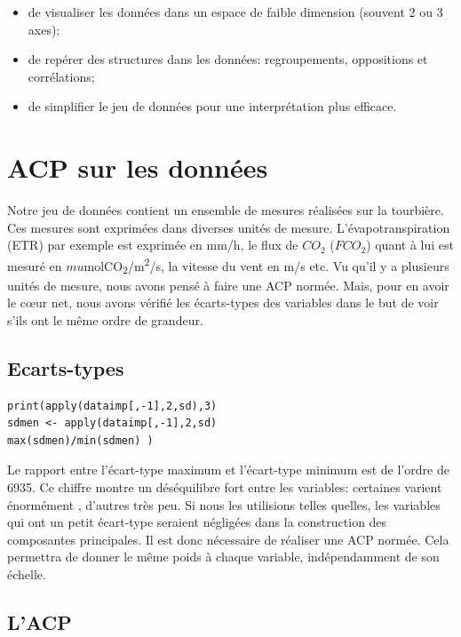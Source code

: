 \documentclass[a4paper,12pt]{report}%
\begin{document}
\begin{itemize}
    \item de visualiser les données dans un espace de faible dimension (souvent 2 ou 3 axes);
    \item de repérer des structures dans les données: regroupements, oppositions et corrélations;
    \item de simplifier le jeu de données pour une interprétation plus efficace.

\end{itemize}

\section{ACP sur les données}

Notre jeu de données contient un ensemble de mesures réalisées sur la tourbière. Ces mesures sont exprimées dans diverses unités de mesure. L'évapotranspiration (ETR) par exemple est exprimée en mm/h, le flux de $CO_2$ ($FCO_2$) quant à lui est mesuré en $mu$molCO\textsubscript{2}/m\textsuperscript{2}/s, la vitesse du vent en m/s etc.
Vu qu'il y a plusieurs unités de mesure, nous avons pensé à faire une ACP normée. Mais, pour en avoir le c\oe ur net, nous avons vérifié les écarts-types des variables dans le but de voir s'ils ont le même ordre de grandeur. 

\subsection{ Ecarts-types }

\begin{lstlisting}
print(apply(dataimp[,-1],2,sd),3)
sdmen <- apply(dataimp[,-1],2,sd)
max(sdmen)/min(sdmen) )
\end{lstlisting}
Le rapport entre l'écart-type maximum et l'écart-type minimum est de l'ordre de 6935. Ce chiffre montre un déséquilibre fort entre les variables: certaines varient énormément , d'autres très peu. Si nous les utilisions telles quelles, les variables  qui ont un petit écart-type seraient négligées dans la construction des composantes principales. Il est donc nécessaire de réaliser une  ACP normée. Cela permettra de donner le même poids à chaque variable, indépendamment de son échelle.

\subsection{L'ACP}
\end{document}
